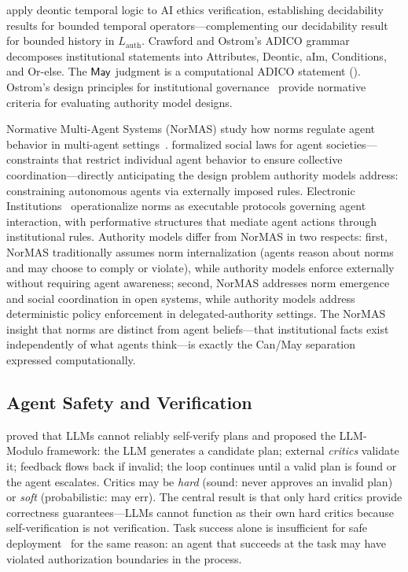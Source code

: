 \documentclass[11pt,a4paper]{article}
\newcommand{\termlabel}[1]{\ifmmode\mathsf{#1}\else{\normalfont\textsc{\MakeLowercase{#1}}}\fi}
\newcommand{\May}{\termlabel{May}}
\begin{document}
\citet{priya2025deonticai} apply deontic temporal logic to AI ethics verification, establishing decidability results for bounded temporal operators---complementing our decidability result for bounded history in $L_{\mathrm{auth}}$. Crawford and Ostrom's ADICO grammar~\citep{crawford1995grammar} decomposes institutional statements into Attributes, Deontic, aIm, Conditions, and Or-else. The $\May$ judgment is a computational ADICO statement (). Ostrom's design principles for institutional governance~\citep{ostrom1990governing} provide normative criteria for evaluating authority model designs.

Normative Multi-Agent Systems (NorMAS) study how norms regulate agent behavior in multi-agent settings~\citep{boella2006normas}. \citet{shoham1995social} formalized social laws for agent societies---constraints that restrict individual agent behavior to ensure collective coordination---directly anticipating the design problem authority models address: constraining autonomous agents via externally imposed rules. Electronic Institutions~\citep{esteva2001electronic} operationalize norms as executable protocols governing agent interaction, with performative structures that mediate agent actions through institutional rules. Authority models differ from NorMAS in two respects: first, NorMAS traditionally assumes norm internalization (agents reason about norms and may choose to comply or violate), while authority models enforce externally without requiring agent awareness; second, NorMAS addresses norm emergence and social coordination in open systems, while authority models address deterministic policy enforcement in delegated-authority settings. The NorMAS insight that norms are distinct from agent beliefs---that institutional facts exist independently of what agents think---is exactly the Can/May separation expressed computationally.

\subsection{Agent Safety and Verification}

\citet{kambhampati2024llmmodulo} proved that LLMs cannot reliably self-verify plans and proposed the LLM-Modulo framework: the LLM generates a candidate plan; external \emph{critics} validate it; feedback flows back if invalid; the loop continues until a valid plan is found or the agent escalates. Critics may be \emph{hard} (sound: never approves an invalid plan) or \emph{soft} (probabilistic: may err). The central result is that only hard critics provide correctness guarantees---LLMs cannot function as their own hard critics because self-verification is not verification. Task success alone is insufficient for safe deployment~\citep{kambhampati2024tasksuccess} for the same reason: an agent that succeeds at the task may have violated authorization boundaries in the process.
\end{document}
